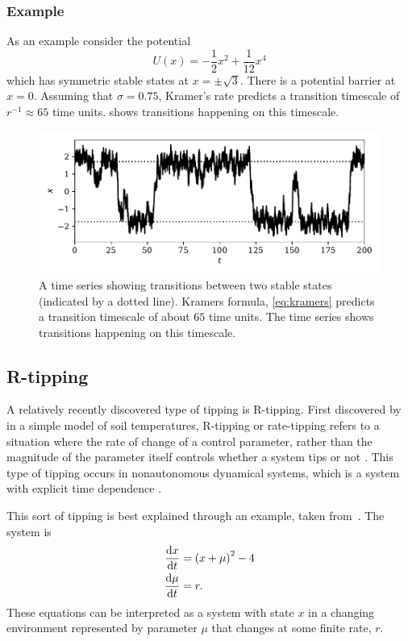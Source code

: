 \subsubsection{Example}
As an example consider the potential
\begin{equation}
  \label{eq:example_potential}
  U(x) = -\frac{1}{2}x^2 + \frac{1}{12}x^4
\end{equation}
which has symmetric stable states at $x = \pm \sqrt{3}$. There is a potential barrier at $x = 0$. Assuming that $\sigma = 0.75$, Kramer's rate predicts a transition
timescale of $r^{-1} \approx 65$ time units.  shows transitions happening on this timescale.

\begin{figure}
  \centering
  \includegraphics[width=\textwidth,keepaspectratio]{noise_trans}
  \caption[An example of N-tipping]{A time series showing transitions between two stable states (indicated by a dotted line). Kramers formula, \cref{eq:kramers} predicts a
    transition timescale of about $65$ time units. The time series shows transitions happening on this timescale.}
  \label{fig:ntipping}
\end{figure}


\subsection{R-tipping}
A relatively recently discovered type of tipping is R-tipping. First discovered by~\cite{Luke2011} in a simple model of soil temperatures, R-tipping or rate-tipping refers to
a situation where the rate of change of a control parameter, rather than the magnitude of the parameter itself  controls whether a system tips or not \parencite{Perryman2014a}.
This type of tipping occurs in nonautonomous dynamical systems, which is a system with explicit time dependence \parencite{Ashwin2017a}.

This sort of tipping is best explained through an example, taken from~\cite{Ashwin2012}. The system is
\begin{subequations}
  \label{eq:rtipping_example}
  \begin{align}
    \dv{x}{t}   &= \left(x + \mu\right)^2 - 4 \label{eq:rtipping_example_x} \\
    \dv{\mu}{t} &= r.                          \label{eq:rtipping_example_r} 
  \end{align}
\end{subequations}
These equations can be interpreted as a system with state $x$ in a changing environment represented by parameter $\mu$ that changes at some finite rate, $r$.

